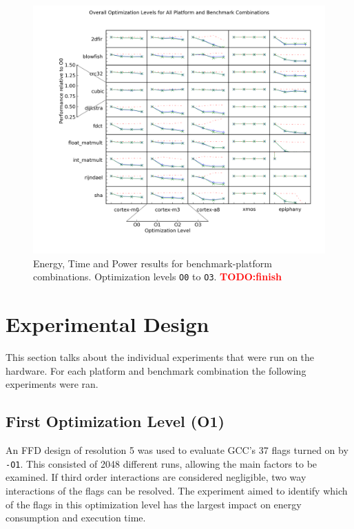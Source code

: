 \documentclass[twocolumn]{article}
\newcommand{\todo}[1]{\textbf{\textcolor{red}{#1}}}
\begin{document}
\begin{figure}[tb!]
	\centering
	\includegraphics[width=\textwidth,clip, trim=2cm 1.5cm 0 0]{levels.png}
	\caption{Energy, Time and Power results for benchmark-platform combinations. Optimization levels \texttt{O0} to \texttt{O3}. \todo{TODO:finish}}
	\label{Fig:OverallView}
\end{figure}

\section*{Experimental Design}

This section talks about the individual experiments that were run on the hardware. For each platform and benchmark combination the following experiments were ran.

\subsection*{First Optimization Level (O1)}

An FFD design of resolution 5 was used to evaluate GCC's 37 flags turned on by \texttt{-O1}. This consisted of 2048 different runs, allowing the main factors to be examined. If third order interactions are considered negligible, two way interactions of the flags can be resolved. The experiment aimed to identify which of the flags in this optimization level has the largest impact on energy consumption and execution time.
\end{document}
